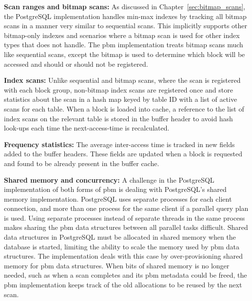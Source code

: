 \textbf{Scan ranges and bitmap scans:} As discussed in Chapter~\ref{sec:bitmap_scans}, the PostgreSQL implementation handles min-max indexes by tracking all bitmap scans in a manner very similar to sequential scans. This implicitly supports other bitmap-only indexes and scenarios where a bitmap scan is used for other index types that \cite{pbm} does not handle. The \gls{pbm} implementation treats bitmap scans much like sequential scans, except the bitmap is used to determine which block will be accessed and should or should not be registered.


\textbf{Index scans:} Unlike sequential and bitmap scans, where the scan is registered with each block group, non-bitmap index scans are registered once and store statistics about the scan in a hash map keyed by table ID with a list of active scans for each table. When a block is loaded into cache, a reference to the list of index scans on the relevant table is stored in the buffer header to avoid hash look-ups each time the next-access-time is recalculated.


\textbf{Frequency statistics:} The average inter-access time is tracked in new fields added to the buffer headers. These fields are updated when a block is requested and found to be already present in the buffer cache.


\textbf{Shared memory and concurrency:} A challenge in the PostgreSQL implementation of both forms of \gls{pbm} is dealing with PostgreSQL's shared memory implementation. PostgreSQL uses separate processes for each client connection, and more than one process for the same client if a parallel query plan is used. Using separate processes instead of separate threads in the same process makes sharing the \gls{pbm} data structures between all parallel tasks difficult. Shared data structures in PostgreSQL must be allocated in shared memory when the database is started, limiting the ability to scale the memory used by \gls{pbm} data structures. The implementation deals with this case by over-provisioning shared memory for \gls{pbm} data structures. When bits of shared memory is no longer needed, such as when a scan completes and its \gls{pbm} metadata could be freed, the \gls{pbm} implementation keeps track of the old allocations to be reused by the next scan.




